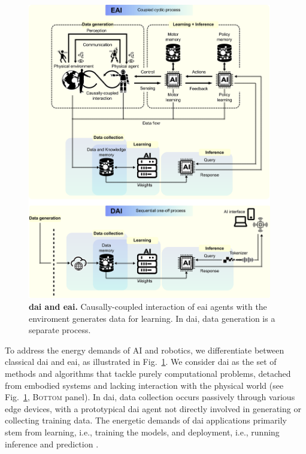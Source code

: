 \documentclass[12pt]{article}
\begin{document}
\begin{figure}[t!]
	\centering
	\hspace*{\fill}
	\includegraphics[width=0.95\textwidth]{eai_and_dai_concept_figure.png}
	\hspace*{\fill}
	\caption[] {\label{fig:eai_and_dai_concept_figure} \textbf{\Ac{dai} and \Ac{eai}.} Causally-coupled interaction of \ac{eai} agents with the enviroment generates data for learning. In \ac{dai}, data generation is a separate process.}
	
\end{figure}


To address the energy demands of AI and robotics, we differentiate between classical \acl{dai} and \acl{eai}, as illustrated in Fig.~\ref{fig:eai_and_dai_concept_figure}. We consider \ac{dai} as the set of methods and algorithms that tackle purely computational problems, detached from embodied systems and lacking interaction with the physical world (see Fig.~\ref{fig:eai_and_dai_concept_figure}, \textsc{Bottom} panel). In \ac{dai}, data collection occurs passively through various edge devices, with a prototypical \ac{dai} agent not directly involved in generating or collecting training data. The energetic demands of \ac{dai} applications primarily stem from learning, i.e., training the models, and deployment, i.e., running inference and prediction \cite{Vries2023growingenergyfootprint}.
\end{document}
